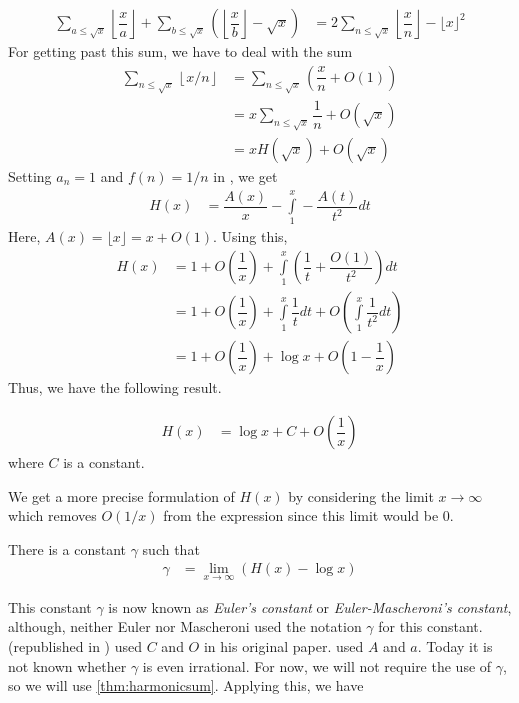 \documentclass[elemannt.tex]{subfile}
\begin{document}
		\begin{align}
			\sum_{a\leq \sqrt{x}}\left\lfloor{\dfrac{x}{a}}\right\rfloor+\sum_{b\leq \sqrt{x}}\left(\left\lfloor{\dfrac{x}{b}}\right\rfloor-\sqrt{x}\right)
				& = 2\sum_{n\leq \sqrt{x}}\left\lfloor{\dfrac{x}{n}}\right\rfloor-\lfloor{x}\rfloor^{2}\label{eqn:totdiv}
		\end{align}
	For getting past this sum, we have to deal with the sum
		\begin{align*}
			\sum_{n\leq \sqrt{x}}\left\lfloor{x/n}\right\rfloor
				& = \sum_{n\leq \sqrt{x}}\left(\dfrac{x}{n}+O(1)\right)\\
				& = x\sum_{n\leq \sqrt{x}}\dfrac{1}{n}+O(\sqrt{x})\\
				& = xH(\sqrt{x})+O(\sqrt{x})
		\end{align*}
	Setting $a_{n}=1$ and $f(n)=1/n$ in , we get
		\begin{align*}
			H(x)
				& = \dfrac{A(x)}{x}-\int\limits_{1}^{x}-\dfrac{A(t)}{t^{2}}dt
		\end{align*}
	Here, $A(x)=\lfloor{x}\rfloor=x+O(1)$. Using this,
		\begin{align*}
			H(x)
				& =  1+O\left(\dfrac{1}{x}\right)+\int\limits_{1}^{x}\left(\dfrac{1}{t}+\dfrac{O(1)}{t^{2}}\right)dt\\
				& = 1+O\left(\dfrac{1}{x}\right)+\int\limits_{1}^{x}\dfrac{1}{t}dt+O\left(\int\limits_{1}^{x}\dfrac{1}{t^{2}}dt\right)\\
				& = 1+O\left(\dfrac{1}{x}\right)+\log{x}+O\left(1-\dfrac{1}{x}\right)
		\end{align*}
	Thus, we have the following result.
		\begin{theorem}\label{thm:harmonicsum}
				\begin{align*}
					H(x)
						& = \log{x}+C+O\left(\dfrac{1}{x}\right)
				\end{align*}
			where $C$ is a constant.
		\end{theorem}
	We get a more precise formulation of $H(x)$ by considering the limit $x\to\infty$ which removes $O(1/x)$ from the expression since this limit would be $0$.
		\begin{theorem}
			There is a constant $\gamma$ such that
				\begin{align*}
					\gamma
						& = \lim\limits_{x\to\infty}(H(x)-\log{x})
				\end{align*}
		\end{theorem}
	This constant $\gamma$ is now known as \textit{Euler's constant} or \textit{Euler-Mascheroni's constant}, although, neither Euler nor Mascheroni used the notation $\gamma$ for this constant. \textcite{euler_1740} (republished in \textcite{euler_2020}) used $C$ and $O$ in his original paper. \textcite{mascheroni_1790} used $A$ and $a$. Today it is not known whether $\gamma$ is even irrational. For now, we will not require the use of $\gamma$, so we will use \autoref{thm:harmonicsum}. Applying this, we have
\end{document}
